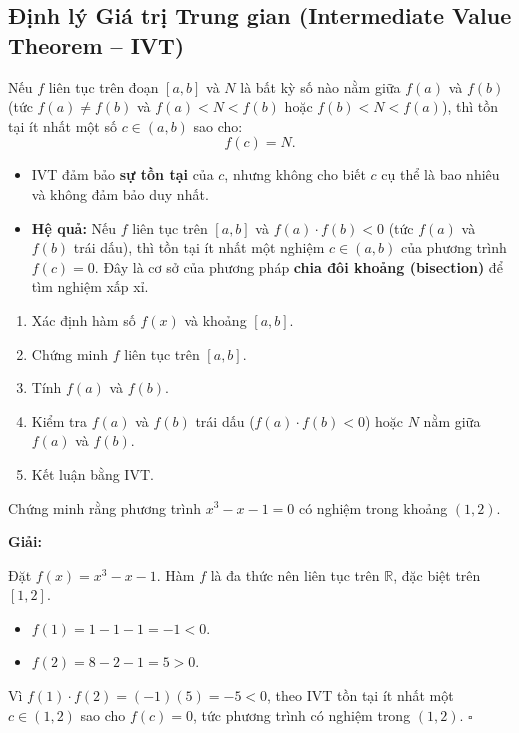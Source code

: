 \documentclass[12pt,a4paper]{article}
\begin{document}
\subsection{Định lý Giá trị Trung gian (Intermediate Value Theorem -- IVT)}

\begin{dinhly}[title={Định lý Giá trị Trung gian (IVT)}]
  Nếu $f$ liên tục trên đoạn $[a, b]$ và $N$ là bất kỳ số nào nằm giữa $f(a)$ và $f(b)$ (tức $f(a) \ne f(b)$ và $f(a) < N < f(b)$ hoặc $f(b) < N < f(a)$), thì tồn tại ít nhất một số $c \in (a, b)$ sao cho:
  \[
    f(c) = N.
  \]
\end{dinhly}

\begin{luuy}
  \begin{itemize}
    \item IVT đảm bảo \textbf{sự tồn tại} của $c$, nhưng không cho biết $c$ cụ thể là bao nhiêu và không đảm bảo duy nhất.
    \item \textbf{Hệ quả:} Nếu $f$ liên tục trên $[a, b]$ và $f(a) \cdot f(b) < 0$ (tức $f(a)$ và $f(b)$ trái dấu), thì tồn tại ít nhất một nghiệm $c \in (a, b)$ của phương trình $f(c) = 0$. Đây là cơ sở của phương pháp \textbf{chia đôi khoảng (bisection)} để tìm nghiệm xấp xỉ.
  \end{itemize}
\end{luuy}

\begin{phuongphap}[title={Áp dụng IVT để chứng minh nghiệm tồn tại}]
  \begin{enumerate}
    \item Xác định hàm số $f(x)$ và khoảng $[a, b]$.
    \item Chứng minh $f$ liên tục trên $[a, b]$.
    \item Tính $f(a)$ và $f(b)$.
    \item Kiểm tra $f(a)$ và $f(b)$ trái dấu ($f(a) \cdot f(b) < 0$) hoặc $N$ nằm giữa $f(a)$ và $f(b)$.
    \item Kết luận bằng IVT.
  \end{enumerate}
\end{phuongphap}

\begin{vidu}
  Chứng minh rằng phương trình $x^3 - x - 1 = 0$ có nghiệm trong khoảng $(1, 2)$.

  \medskip\textbf{Giải:}

  Đặt $f(x) = x^3 - x - 1$. Hàm $f$ là đa thức nên liên tục trên $\mathbb{R}$, đặc biệt trên $[1, 2]$.
  \begin{itemize}
    \item $f(1) = 1 - 1 - 1 = -1 < 0$.
    \item $f(2) = 8 - 2 - 1 = 5 > 0$.
  \end{itemize}
  Vì $f(1) \cdot f(2) = (-1)(5) = -5 < 0$, theo IVT tồn tại ít nhất một $c \in (1, 2)$ sao cho $f(c) = 0$, tức phương trình có nghiệm trong $(1, 2)$. $\square$
\end{vidu}
\end{document}

